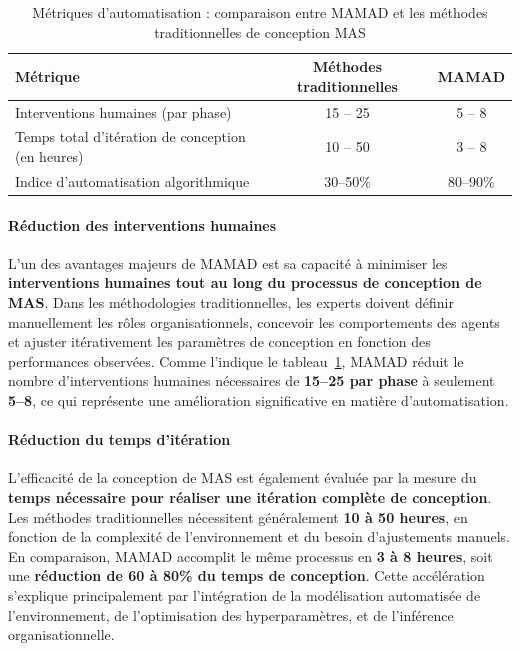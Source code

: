 \documentclass[pdflatex,sn-mathphys-num]{sn-jnl}%
\theoremstyle{thmstyleone}%
\theoremstyle{thmstyletwo}%
\theoremstyle{thmstylethree}%
\begin{document}
\begin{table}[h!]
    \centering
    \caption{Métriques d'automatisation : comparaison entre MAMAD et les méthodes traditionnelles de conception MAS}
    \begin{tabular}{lcc}
        \hline
        \textbf{Métrique}                                   & \textbf{Méthodes traditionnelles} & \textbf{MAMAD} \\
        \hline
        Interventions humaines (par phase)                 & 15 -- 25                          & 5 -- 8         \\
        \hline
        Temps total d'itération de conception (en heures)  & 10 -- 50                          & 3 -- 8         \\
        \hline
        Indice d'automatisation algorithmique              & 30--50\%                          & 80--90\%       \\
        \hline
    \end{tabular}
    \label{tab:automation_fr}
\end{table}

\paragraph{Réduction des interventions humaines}

L'un des avantages majeurs de MAMAD est sa capacité à minimiser les \textbf{interventions humaines tout au long du processus de conception de MAS}. Dans les méthodologies traditionnelles, les experts doivent définir manuellement les rôles organisationnels, concevoir les comportements des agents et ajuster itérativement les paramètres de conception en fonction des performances observées. Comme l'indique le tableau~\ref{tab:automation_fr}, MAMAD réduit le nombre d'interventions humaines nécessaires de \textbf{15--25 par phase} à seulement \textbf{5--8}, ce qui représente une amélioration significative en matière d'automatisation.

\paragraph{Réduction du temps d'itération}

L'efficacité de la conception de MAS est également évaluée par la mesure du \textbf{temps nécessaire pour réaliser une itération complète de conception}. Les méthodes traditionnelles nécessitent généralement \textbf{10 à 50 heures}, en fonction de la complexité de l'environnement et du besoin d'ajustements manuels. En comparaison, MAMAD accomplit le même processus en \textbf{3 à 8 heures}, soit une \textbf{réduction de 60 à 80\% du temps de conception}. Cette accélération s'explique principalement par l'intégration de la modélisation automatisée de l'environnement, de l'optimisation des hyperparamètres, et de l'inférence organisationnelle.
\end{document}
